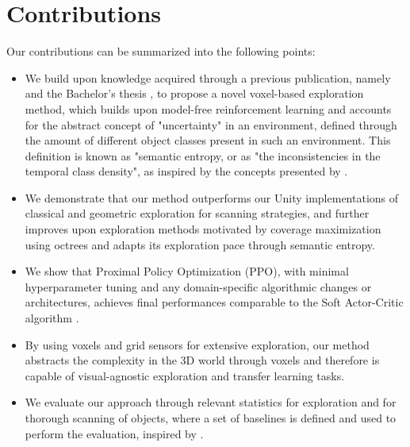 \section{Contributions}\label{chap:1:contributions}
Our contributions can be summarized into the following points:
\begin{itemize}
    \item We build upon knowledge acquired through a previous publication, namely \textit{}\cite{DBLP:journals/corr/abs-2105-09843}
    and the Bachelor's thesis \textit{}
    , to propose a novel voxel-based exploration method, which builds upon model-free
    reinforcement learning
    and accounts for the abstract concept of "uncertainty" in an environment, defined through the amount of different object classes present in such an environment. This definition is known as "semantic entropy, or as "the inconsistencies in the temporal class density", as inspired by the concepts presented by \textcite{chaplot2020semantic}.
    
    \item We demonstrate that our method outperforms our Unity implementations of classical and geometric exploration for scanning strategies, and further improves upon exploration methods motivated by coverage maximization \cite{chen2019learning} using octrees and adapts its exploration pace through semantic entropy.
    
    \item We show that Proximal Policy Optimization (PPO), with minimal hyperparameter tuning and any domain-specific algorithmic changes or architectures, achieves final performances comparable to the Soft Actor-Critic algorithm \cite{schulman2017proximal}.
    \item By using voxels and grid sensors for extensive exploration, our method abstracts the complexity in the 3D world through voxels and therefore is capable of visual-agnostic exploration and transfer learning tasks. 
    
    \item We evaluate our approach through relevant statistics for exploration and for thorough scanning of objects, where a set of baselines is defined and used to perform the evaluation, inspired by \textcite{darpa_subterranean_challenge}.
    

\end{itemize}
